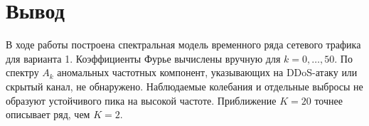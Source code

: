 \documentclass[12pt,a4paper]{article}
\begin{document}
\section{Вывод}
В ходе работы построена спектральная модель временного ряда сетевого трафика для варианта 1. Коэффициенты Фурье вычислены вручную для \(k=0,\dots,50\). По спектру \(A_k\) аномальных частотных компонент, указывающих на DDoS-атаку или скрытый канал, не обнаружено. Наблюдаемые колебания и отдельные выбросы не образуют устойчивого пика на высокой частоте. Приближение \(K=20\) точнее описывает ряд, чем \(K=2\).
\end{document}
